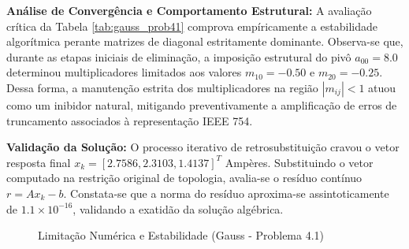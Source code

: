 \begin{table}[H]
\centering
\caption{Histórico de Eliminação e Substituição (Problema 4.1 - Gauss)}
\label{tab:gauss_prob41}
\end{table}

\textbf{Análise de Convergência e Comportamento Estrutural:} A avaliação crítica da Tabela \ref{tab:gauss_prob41} comprova empíricamente a estabilidade algorítmica perante matrizes de diagonal estritamente dominante. Observa-se que, durante as etapas iniciais de eliminação, a imposição estrutural do pivô $a_{00} = 8.0$ determinou multiplicadores limitados aos valores $m_{10} = -0.50$ e $m_{20} = -0.25$. Dessa forma, a manutenção estrita dos multiplicadores na região $|m_{ij}| < 1$ atuou como um inibidor natural, mitigando preventivamente a amplificação de erros de truncamento associados à representação IEEE 754.

\textbf{Validação da Solução:} O processo iterativo de retrosubstituição cravou o vetor resposta final $x_k =[2.7586, 2.3103, 1.4137]^T$ Ampères. Substituindo o vetor computado na restrição original de topologia, avalia-se o resíduo contínuo $r = Ax_k - b$. Constata-se que a norma do resíduo aproxima-se assintoticamente de $1.1 \times 10^{-16}$, validando a exatidão da solução algébrica.

\begin{figure}[H]
\centering
{}
\caption{Limitação Numérica e Estabilidade (Gauss - Problema 4.1)}
\label{fig:gauss_prob41}
\end{figure}


